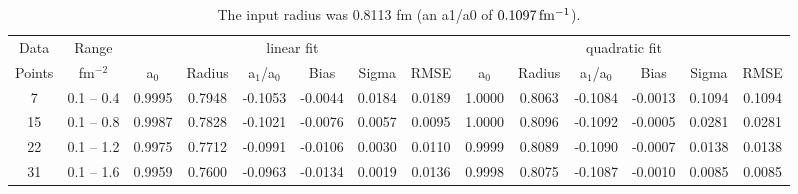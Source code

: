 \documentclass[10pt,aps,prc,twocolumn]{revtex4-1}
\begin{document}
\begin{table}
\caption{The input radius was 0.8113 fm (an a1/a0 of $\unit[0.1097]{fm^{-1}}$).}
\begin{tabular}{cc|cccccc|cccccc} \hline
Data   & Range     & \multicolumn{6}{c|}{linear fit}                       & \multicolumn{6}{c}{quadratic fit}                    \\ 
Points & fm$^{-2}$ &   a$_0$  & Radius&  a$_1$/a$_0$ &  Bias  & Sigma &  RMSE  &   a$_0$  & Radius& a$_1$/a$_0$  &  Bias  & Sigma &  RMSE \\  \hline
7      & 0.1 -- 0.4 & 0.9995& 0.7948& -0.1053& -0.0044& 0.0184& 0.0189 & 1.0000& 0.8063& -0.1084& -0.0013& 0.1094& 0.1094\\
15     & 0.1 -- 0.8 & 0.9987& 0.7828& -0.1021& -0.0076& 0.0057& 0.0095 & 1.0000& 0.8096& -0.1092& -0.0005& 0.0281& 0.0281\\
22     & 0.1 -- 1.2 & 0.9975& 0.7712& -0.0991& -0.0106& 0.0030& 0.0110 & 0.9999& 0.8089& -0.1090& -0.0007& 0.0138& 0.0138\\
31     & 0.1 -- 1.6 & 0.9959& 0.7600& -0.0963& -0.0134& 0.0019& 0.0136 & 0.9998& 0.8075& -0.1087& -0.0010& 0.0085& 0.0085\\ \hline
\end{tabular}
\label{fulltable}
\end{table}
\end{document}
